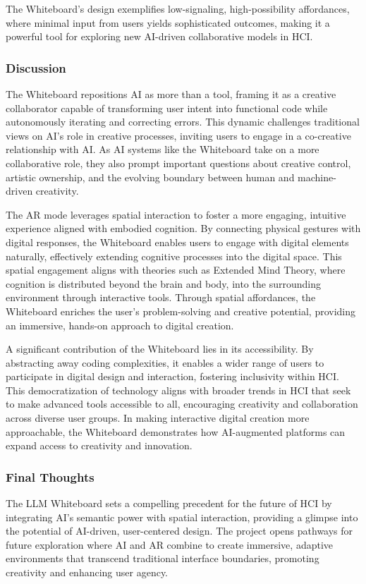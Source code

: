 The Whiteboard’s design exemplifies low-signaling, high-possibility affordances, where minimal input from users yields sophisticated outcomes, making it a powerful tool for exploring new AI-driven collaborative models in HCI.

\subsubsection{Discussion}

The Whiteboard repositions AI as more than a tool, framing it as a creative collaborator capable of transforming user intent into functional code while autonomously iterating and correcting errors.
This dynamic challenges traditional views on AI’s role in creative processes, inviting users to engage in a co-creative relationship with AI.
As AI systems like the Whiteboard take on a more collaborative role, they also prompt important questions about creative control, artistic ownership, and the evolving boundary between human and machine-driven creativity.

The AR mode leverages spatial interaction to foster a more engaging, intuitive experience aligned with embodied cognition.
By connecting physical gestures with digital responses, the Whiteboard enables users to engage with digital elements naturally, effectively extending cognitive processes into the digital space.
This spatial engagement aligns with theories such as Extended Mind Theory\cite{andy1998extended}, where cognition is distributed beyond the brain and body, into the surrounding environment through interactive tools.
Through spatial affordances, the Whiteboard enriches the user’s problem-solving and creative potential, providing an immersive, hands-on approach to digital creation.

A significant contribution of the Whiteboard lies in its accessibility.
By abstracting away coding complexities, it enables a wider range of users to participate in digital design and interaction, fostering inclusivity within HCI.
This democratization of technology aligns with broader trends in HCI that seek to make advanced tools accessible to all, encouraging creativity and collaboration across diverse user groups.
In making interactive digital creation more approachable, the Whiteboard demonstrates how AI-augmented platforms can expand access to creativity and innovation.

\subsubsection{Final Thoughts}
The LLM Whiteboard sets a compelling precedent for the future of HCI by integrating AI’s semantic power with spatial interaction, providing a glimpse into the potential of AI-driven, user-centered design.
The project opens pathways for future exploration where AI and AR combine to create immersive, adaptive environments that transcend traditional interface boundaries, promoting creativity and enhancing user agency.

